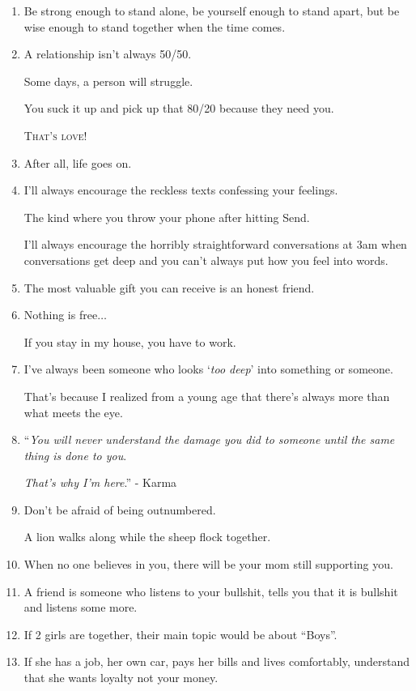 \documentclass{article}
\numberwithin{equation}{section}
\begin{document}
\begin{enumerate}
    Not sure if that's a good thing or a bad thing, but it's the truth.
    \item Be strong enough to stand alone, be yourself enough to stand apart, but be wise enough to stand together when the time comes.
    \item A relationship isn't always 50/50.
    
    Some days, a person will struggle.
    
    You suck it up and pick up that 80/20 because they need you.
    
    \textsc{That's love!}
    \item After all, life goes on.
    \item I'll always encourage the reckless texts confessing your feelings.
    
    The kind where you throw your phone after hitting Send.
    
    I'll always encourage the horribly straightforward conversations at 3am when conversations get deep and you can't always put how you feel into words.
    \item The most valuable gift you can receive is an honest friend.
    \item Nothing is free$\ldots$
    
    If you stay in my house, you have to work.
    \item I've always been someone who looks `\textit{too deep}' into something or someone.
    
    That's because I realized from a young age that there's always more than what meets the eye.
    \item ``\textit{You will never understand the damage you did to someone until the same thing is done to you}.
    
    \textit{That's why I'm here}.'' - Karma
    \item Don't be afraid of being outnumbered.
    
    A lion walks along while the sheep flock together.
    \item When no one believes in you, there will be your mom still supporting you.
    \item A friend is someone who listens to your bullshit, tells you that it is bullshit and listens some more.
    \item If 2 girls are together, their main topic would be about ``Boys''.
    \item If she has a job, her own car, pays her bills and lives comfortably, understand that she wants loyalty not your money.
    

\end{enumerate}
\end{document}
